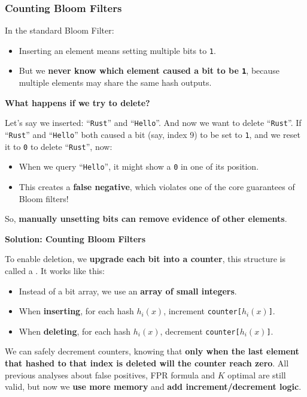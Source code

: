 \subsubsection{Counting Bloom Filters}

In the standard Bloom Filter:
\begin{itemize}
    \item Inserting an element means setting multiple bits to \texttt{1}.
    \item But we \textbf{never know which element caused a bit to be \texttt{1}}, because multiple elements may share the same hash outputs.
\end{itemize}

\highspace
\begin{flushleft}
    \textcolor{Red2}{ \textbf{What happens if we try to delete?}}
\end{flushleft}
Let's say we inserted: ``\texttt{Rust}'' and ``\texttt{Hello}''. And now we want to delete ``\texttt{Rust}''. If ``\texttt{Rust}'' and ``\texttt{Hello}'' both caused a bit (say, index 9) to be set to \texttt{1}, and we reset it to \texttt{0} to delete ``\texttt{Rust}'', now:
\begin{itemize}
    \item When we query ``\texttt{Hello}'', it might show a \texttt{0} in one of its position.
    \item This creates a \textbf{false negative}, which violates one of the core guarantees of Bloom filters!
\end{itemize}
So, \textbf{manually unsetting bits can remove evidence of other elements}.

\highspace
\begin{flushleft}
    \textcolor{Green3}{ \textbf{Solution: Counting Bloom Filters}}
\end{flushleft}
To enable deletion, we \textbf{upgrade each bit into a counter}, this structure is called a . It works like this:
\begin{itemize}
    \item Instead of a bit array, we use an \textbf{array of small integers}.
    \item When \textbf{inserting}, for each hash $h_{i}\left(x\right)$, increment \texttt{counter[$h_{i}\left(x\right)$]}.
    \item When \textbf{deleting}, for each hash $h_{i}\left(x\right)$, decrement \texttt{counter[$h_{i}\left(x\right)$]}.
\end{itemize}
We can safely decrement counters, knowing that \textbf{only when the last element that hashed to that index is deleted will the counter reach zero}. All previous analyses about false positives, FPR formula and $K$ optimal are still valid, but now we \textbf{use more memory} and \textbf{add increment/decrement logic}.


